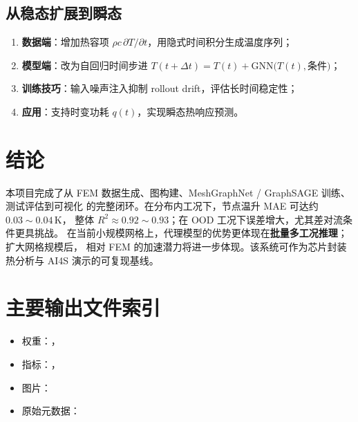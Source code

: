 \documentclass[11pt,a4paper]{article}
\begin{document}
\subsection{从稳态扩展到瞬态}
\begin{enumerate}[leftmargin=1.5em]
  \item \textbf{数据端}：增加热容项 \(\rho c\,\partial T/\partial t\)，用隐式时间积分生成温度序列；
  \item \textbf{模型端}：改为自回归时间步进
  \(T(t+\Delta t)=T(t)+\mathrm{GNN}\big(T(t),\text{条件}\big)\)；
  \item \textbf{训练技巧}：输入噪声注入抑制 rollout drift，评估长时间稳定性；
  \item \textbf{应用}：支持时变功耗 \(q(t)\)，实现瞬态热响应预测。
\end{enumerate}


\section{结论}

本项目完成了从 FEM 数据生成、图构建、MeshGraphNet / GraphSAGE 训练、测试评估到可视化
的完整闭环。在分布内工况下，节点温升 MAE 可达约 \(0.03\sim 0.04\,\mathrm{K}\)，
整体 \(R^2\approx 0.92\sim 0.93\)；在 OOD 工况下误差增大，尤其差对流条件更具挑战。
在当前小规模网格上，代理模型的优势更体现在\textbf{批量多工况推理}；扩大网格规模后，
相对 FEM 的加速潜力将进一步体现。该系统可作为芯片封装热分析与 AI4S 演示的可复现基线。


\appendix
\section{主要输出文件索引}
\begin{itemize}[leftmargin=1.5em]
  \item 权重：，
  \item 指标：，
  \item 图片：
  \item 原始元数据：
\end{itemize}
\end{document}
